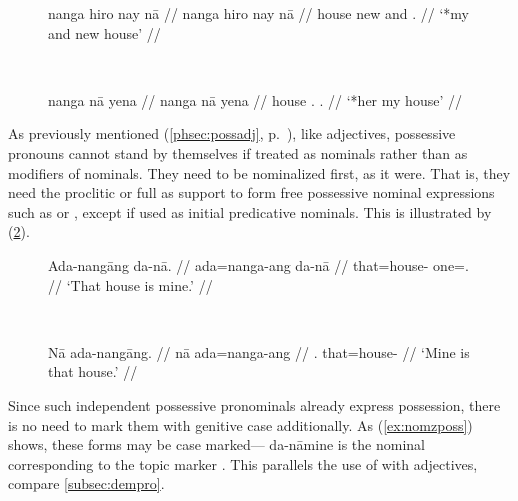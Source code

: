 \begin{figure}[h]
\ex{}\label{ex:possnoadj}
\begin{minipage}[t]{.5\remaining}
\tl\quad\ljudge*\begingl
	\gla nanga hiro nay nā //
	\glb nanga hiro nay nā //
	\glc house new and \Fsg{}.\Gen{} //
	\glft `*my and new house' //
\endgl
\end{minipage}
~
\begin{minipage}[t]{.5\remaining}
\tl\quad\ljudge*\begingl
	\gla nanga nā yena //
	\glb nanga nā yena //
	\glc house \Fsg{}.\Gen{} \TsgF{}.\Gen{} //
	\glft `*her my house' //
\endgl
\end{minipage}
\xe
\end{figure}

As previously mentioned (\autoref{phsec:possadj}, p.~\pageref{phsec:possadj}),
like adjectives, possessive pronouns cannot stand by themselves if treated as
nominals rather than as modifiers of nominals. They need to be nominalized
first, as it were. That is, they need the proclitic  or full
 as support to form free possessive nominal expressions
such as  or , except if used as initial predicative
nominals. This is illustrated by (\ref{ex:genpred2}).

\begin{figure}[h]
\ex{}\label{ex:genpred2}
\begin{minipage}[t]{.5\remaining}
\tl\quad\begingl
	\gla Ada-nangāng da-nā. //
	\glb ada=nanga-ang da-nā //
	\glc that=house-\Aarg{} one=\Fsg{}.\Gen{} //
	\glft `That house is mine.' //
\endgl
\end{minipage}
~
\begin{minipage}[t]{.5\remaining}
\tl\quad\begingl
	\gla Nā ada-nangāng. //
	\glb nā ada=nanga-ang //
	\glc \Fsg{}.\Gen{} that=house-\Aarg{} //
	\glft `Mine is that house.' //
\endgl
\end{minipage}
\xe
\end{figure}

Since such independent possessive pronominals already express possession, there
is no need to mark them with genitive case additionally. As
(\ref{ex:nomzposs}) shows, these forms may be case marked---
{da-nā}{mine} is the nominal corresponding to the topic marker .
This parallels the use of  with adjectives, compare
\autoref{subsec:dempro}.

